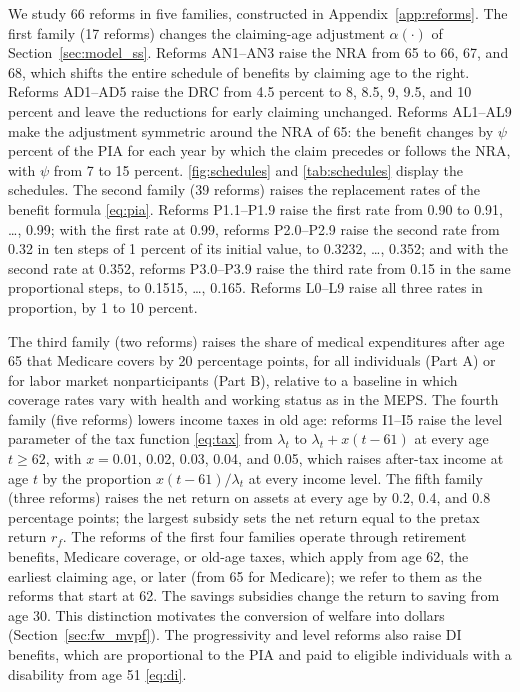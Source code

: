 We study 66 reforms in five families, constructed in Appendix~\ref{app:reforms}. The first family (17 reforms) changes the claiming-age adjustment $\alpha(\cdot)$ of Section~\ref{sec:model_ss}. Reforms AN1--AN3 raise the NRA from 65 to 66, 67, and 68, which shifts the entire schedule of benefits by claiming age to the right. Reforms AD1--AD5 raise the DRC from 4.5 percent to 8, 8.5, 9, 9.5, and 10 percent and leave the reductions for early claiming unchanged. Reforms AL1--AL9 make the adjustment symmetric around the NRA of 65: the benefit changes by $\psi$ percent of the PIA for each year by which the claim precedes or follows the NRA, with $\psi$ from 7 to 15 percent. \autoref{fig:schedules} and \autoref{tab:schedules} display the schedules. The second family (39 reforms) raises the replacement rates of the benefit formula \eqref{eq:pia}. Reforms P1.1--P1.9 raise the first rate from 0.90 to 0.91, \ldots, 0.99; with the first rate at 0.99, reforms P2.0--P2.9 raise the second rate from 0.32 in ten steps of 1 percent of its initial value, to 0.3232, \ldots, 0.352; and with the second rate at 0.352, reforms P3.0--P3.9 raise the third rate from 0.15 in the same proportional steps, to 0.1515, \ldots, 0.165. Reforms L0--L9 raise all three rates in proportion, by 1 to 10 percent.

The third family (two reforms) raises the share of medical expenditures after age 65 that Medicare covers by 20 percentage points, for all individuals (Part A) or for labor market nonparticipants (Part B), relative to a baseline in which coverage rates vary with health and working status as in the MEPS. The fourth family (five reforms) lowers income taxes in old age: reforms I1--I5 raise the level parameter of the tax function \eqref{eq:tax} from $\lambda_t$ to $\lambda_t+x(t-61)$ at every age $t\geq 62$, with $x=0.01$, 0.02, 0.03, 0.04, and 0.05, which raises after-tax income at age $t$ by the proportion $x(t-61)/\lambda_t$ at every income level. The fifth family (three reforms) raises the net return on assets at every age by 0.2, 0.4, and 0.8 percentage points; the largest subsidy sets the net return equal to the pretax return $r_f$. The reforms of the first four families operate through retirement benefits, Medicare coverage, or old-age taxes, which apply from age 62, the earliest claiming age, or later (from 65 for Medicare); we refer to them as the reforms that start at 62. The savings subsidies change the return to saving from age 30. This distinction motivates the conversion of welfare into dollars (Section~\ref{sec:fw_mvpf}). The progressivity and level reforms also raise DI benefits, which are proportional to the PIA and paid to eligible individuals with a disability from age 51 \eqref{eq:di}.

